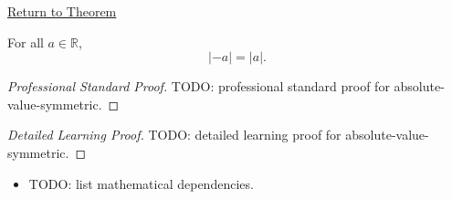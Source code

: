 \newpage
{}
\label{prf:absolute-value-symmetric}

\begin{remark*}[Return]
\hyperref[thm:absolute-value-symmetric]{Return to Theorem}
\end{remark*}

\begin{theorem*}
For all $a \in \mathbb{R}$,
\[
  \lvert -a \rvert = \lvert a \rvert.
\]
\end{theorem*}

\begin{proof}[Professional Standard Proof]
\LRAProofBodyStart
TODO: professional standard proof for absolute-value-symmetric.
\end{proof}

\begin{proof}[Detailed Learning Proof]
\LRAProofBodyStart
TODO: detailed learning proof for absolute-value-symmetric.
\end{proof}

\begin{remark*}
\end{remark*}

\begin{dependencies}
\begin{itemize}
  \item TODO: list mathematical dependencies.
\end{itemize}
\end{dependencies}

\clearpage
